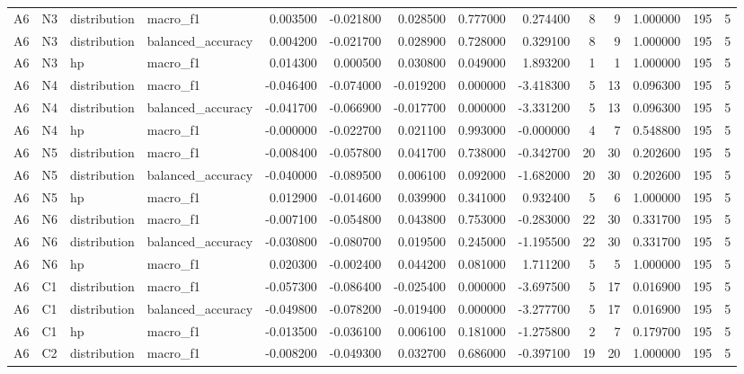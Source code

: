 \begin{table}
\begin{tabular}{llllrrrrrrrrrr}
A6 & N3 & distribution & macro\_f1 & 0.003500 & -0.021800 & 0.028500 & 0.777000 & 0.274400 & 8 & 9 & 1.000000 & 195 & 5 \\
A6 & N3 & distribution & balanced\_accuracy & 0.004200 & -0.021700 & 0.028900 & 0.728000 & 0.329100 & 8 & 9 & 1.000000 & 195 & 5 \\
A6 & N3 & hp & macro\_f1 & 0.014300 & 0.000500 & 0.030800 & 0.049000 & 1.893200 & 1 & 1 & 1.000000 & 195 & 5 \\
A6 & N4 & distribution & macro\_f1 & -0.046400 & -0.074000 & -0.019200 & 0.000000 & -3.418300 & 5 & 13 & 0.096300 & 195 & 5 \\
A6 & N4 & distribution & balanced\_accuracy & -0.041700 & -0.066900 & -0.017700 & 0.000000 & -3.331200 & 5 & 13 & 0.096300 & 195 & 5 \\
A6 & N4 & hp & macro\_f1 & -0.000000 & -0.022700 & 0.021100 & 0.993000 & -0.000000 & 4 & 7 & 0.548800 & 195 & 5 \\
A6 & N5 & distribution & macro\_f1 & -0.008400 & -0.057800 & 0.041700 & 0.738000 & -0.342700 & 20 & 30 & 0.202600 & 195 & 5 \\
A6 & N5 & distribution & balanced\_accuracy & -0.040000 & -0.089500 & 0.006100 & 0.092000 & -1.682000 & 20 & 30 & 0.202600 & 195 & 5 \\
A6 & N5 & hp & macro\_f1 & 0.012900 & -0.014600 & 0.039900 & 0.341000 & 0.932400 & 5 & 6 & 1.000000 & 195 & 5 \\
A6 & N6 & distribution & macro\_f1 & -0.007100 & -0.054800 & 0.043800 & 0.753000 & -0.283000 & 22 & 30 & 0.331700 & 195 & 5 \\
A6 & N6 & distribution & balanced\_accuracy & -0.030800 & -0.080700 & 0.019500 & 0.245000 & -1.195500 & 22 & 30 & 0.331700 & 195 & 5 \\
A6 & N6 & hp & macro\_f1 & 0.020300 & -0.002400 & 0.044200 & 0.081000 & 1.711200 & 5 & 5 & 1.000000 & 195 & 5 \\
A6 & C1 & distribution & macro\_f1 & -0.057300 & -0.086400 & -0.025400 & 0.000000 & -3.697500 & 5 & 17 & 0.016900 & 195 & 5 \\
A6 & C1 & distribution & balanced\_accuracy & -0.049800 & -0.078200 & -0.019400 & 0.000000 & -3.277700 & 5 & 17 & 0.016900 & 195 & 5 \\
A6 & C1 & hp & macro\_f1 & -0.013500 & -0.036100 & 0.006100 & 0.181000 & -1.275800 & 2 & 7 & 0.179700 & 195 & 5 \\
A6 & C2 & distribution & macro\_f1 & -0.008200 & -0.049300 & 0.032700 & 0.686000 & -0.397100 & 19 & 20 & 1.000000 & 195 & 5 \\

\end{tabular}
\end{table}
